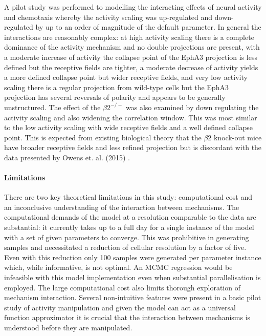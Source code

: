 A pilot study was performed to modelling the interacting effects of neural activity and chemotaxis whereby the activity scaling was up-regulated and down-regulated by up to an order of magnitude of the default parameter. In general the interactions are reasonably complex: at high activity scaling there is a complete dominance of the activity mechanism and no double projections are present, with a moderate increase of activity the collapse point of the EphA3 projection is less defined but the receptive fields are tighter, a moderate decrease of activity yields a more defined collapse point but wider receptive fields, and very low activity scaling there is a regular projection from wild-type cells but the EphA3 projection has several reversals of polarity and appears to be generally unstructured. The effect of the $\beta2^{-/-}$ was also examined by down regulating the activity scaling and also widening the correlation window. This was most similar to the low activity scaling with wide receptive fields and a well defined collapse point. This is expected from existing biological theory that the $\beta2$ knock-out mice have broader receptive fields and less refined projection but is discordant with the data presented by Owens et. al. (2015) \cite{Owens2015-zv}.

\paragraph{Limitations} 
There are two key theoretical limitations in this study: computational cost and an inconclusive understanding of the interaction between mechanisms. The computational demands of the model at a resolution comparable to the data are substantial: it currently takes up to a full day for a single instance of the model with a set of given parameters to converge. This was prohibitive in generating samples and necessitated a reduction of cellular resolution by a factor of five. Even with this reduction only 100 samples were generated per parameter instance which, while informative, is not optimal. An MCMC regression would be infeasible with this model implementation even when substantial parallelisation is employed. The large computational cost also limits thorough exploration of mechanism interaction. Several non-intuitive features were present in a basic pilot study of activity manipulation and given the model can act as a universal function approximator it is crucial that the interaction between mechanisms is understood before they are manipulated.

